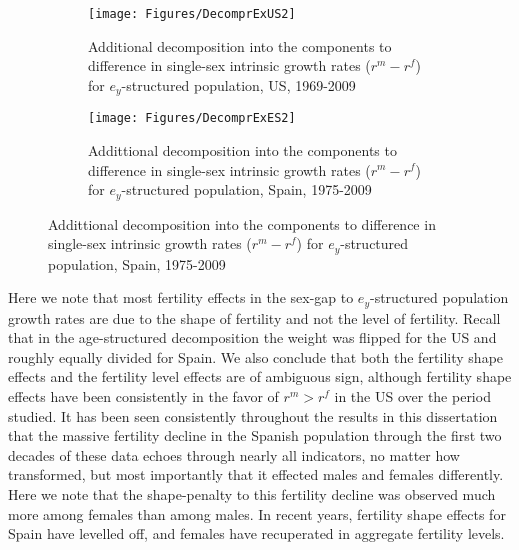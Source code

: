 \begin{figure}
        \centering
        \begin{subfigure}
                \centering
                \caption{Additional decomposition into the components
                to difference in single-sex intrinsic growth rates
                ($r^m - r^f$) for $e_y$-structured population, US, 1969-2009}
                \texttt{[image: Figures/DecomprExUS2]}
                \label{fig:exDecomprUS2}
        \end{subfigure}
        \begin{subfigure}
                \centering
                \caption{Addittional decomposition into the components to difference in single-sex intrinsic growth
                rates ($r^m - r^f$) for $e_y$-structured population, Spain,
                1975-2009}
                \texttt{[image: Figures/DecomprExES2]}
                \label{fig:exDecomprES2}
        \end{subfigure}
\end{figure}

 Here we note that most fertility effects in the sex-gap to $e_y$-structured
 population growth rates are due to the shape of fertility and not the level of
 fertility. Recall that in the age-structured decomposition the weight was
 flipped for the US and roughly equally divided for Spain. We also conclude that
 both the fertility shape effects and the fertility level effects are of
 ambiguous sign, although fertility shape effects have been
 consistently in the favor of $r^m > r^f$ in the US over the period studied. It
 has been seen consistently throughout the results in this dissertation that
 the massive fertility decline in the Spanish population through the first two
 decades of these data echoes through nearly all indicators, no matter how
 transformed, but most importantly that it effected males and females differently. 
 Here we note that the shape-penalty to
 this fertility decline was observed much more among females than among males.
 In recent years, fertility shape effects for Spain have levelled off, and
 females have recuperated in aggregate fertility levels.
 
